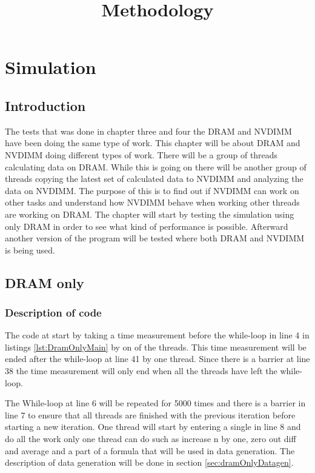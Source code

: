 \documentclass[12pt,a4paper,USenglish]{article}      %
\title{Methodology}  %
\begin{document}
\section{Simulation}
\subsection{Introduction}
The tests that was done in chapter three and four the DRAM and NVDIMM have been doing the same type of work. This chapter will be about DRAM and NVDIMM doing different types of work. 
There will be a group of threads calculating data on DRAM. While this is going on there will be another group of threads copying the latest set of calculated data to NVDIMM and analyzing the data on NVDIMM.
The purpose of this is to find out if NVDIMM can work on other tasks and understand how NVDIMM behave when working other threads are working on DRAM.
The chapter will start by testing the simulation using only DRAM in order to see what kind of performance is possible. Afterward another version of the program will be tested where both DRAM and NVDIMM is being used. 

\subsection{DRAM only}
\label{section:DramOnly}
\subsubsection{Description of code}
The code at start by taking a time measurement before the while-loop in line 4 in listings \ref{lst:DramOnlyMain} by on of the threads. This time measurement will be ended after the while-loop at line 41 by one thread. Since there is a barrier at line 38 the time measurement will only end when all the threads have left the while-loop.

The While-loop at line 6 will be repeated for 5000 times and there is a barrier in line 7 to ensure that all threads are finished with the previous iteration before starting a new iteration. One thread will start by entering a single in line 8 and do all the work only one thread can do such as increase n by one, zero out diff and average and a part of a formula that will be used in data generation.
The description of data generation will be done in section \ref{sec:dramOnlyDatagen}.
\end{document}
